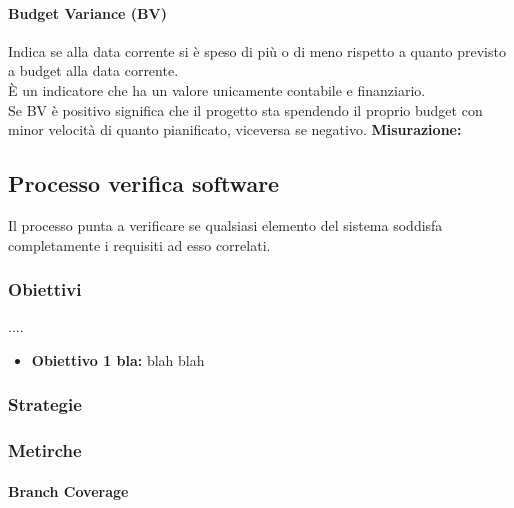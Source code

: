 \documentclass[PianoDiQualifica.tex]{subfiles}
\begin{document}
\paragraph{Budget Variance (BV)}
Indica se alla data corrente si è speso di più o di meno rispetto a quanto previsto a budget alla data corrente.\\
È un indicatore che ha un valore unicamente contabile e finanziario.\\
Se BV è positivo significa che il progetto sta spendendo il proprio budget con minor velocità di quanto pianificato, viceversa se negativo.
\textbf{Misurazione:}



\subsection{Processo verifica software}
Il processo punta a verificare se qualsiasi elemento del sistema soddisfa completamente i requisiti ad esso correlati.
\subsubsection{Obiettivi}
....
 \begin{itemize}
 	\item \textbf{Obiettivo 1 bla:} blah blah 
 \end{itemize}
 
\subsubsection{Strategie}
 
\subsubsection{Metirche}
\paragraph{Branch Coverage}%
\end{document}
